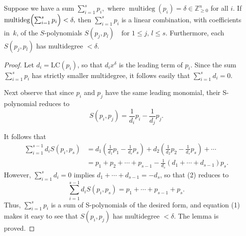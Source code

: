 \begin{lemma}\label{lem:Spolynomial_syzygy_of_degree_cancellation} %
    \leanok %
    Suppose we have a sum $\sum_{i=1}^s p_i,$ where $\operatorname{multideg}(p_i)=\delta\in\mathbb Z_{\ge0}^n$ for all $i$.
    If $\operatorname{multideg}\Bigl(\sum_{i=1}^s p_i\Bigr)<\delta,$ then $\sum_{i=1}^s p_i$ is a linear combination, with coefficients in~$k$, of the $S$-polynomials $S(p_j,p_l)\quad\text{for }1\le j,\,l\le s$.
    Furthermore, each $S(p_j,p_l)$ has multidegree $<\delta$.
\end{lemma}
\begin{proof}
  \leanok
  Let $d_i = \text{LC}(p_i)$, so that $d_i x^\delta$ is the leading term of $p_i$. Since the sum $\sum_{i=1}^s p_i$ has strictly smaller multidegree, it follows easily that $\sum_{i=1}^s d_i = 0$.

  Next observe that since $p_i$ and $p_j$ have the same leading monomial, their S-polynomial reduces to
  \begin{equation} \tag{1}
  S(p_i, p_j) = \frac{1}{d_i}p_i - \frac{1}{d_j}p_j.
  \end{equation}

  It follows that
  \begin{equation} \tag{2}
  \begin{aligned}
  \sum_{i=1}^{s-1} d_i S(p_i, p_s) &= d_1\left(\frac{1}{d_1}p_1 - \frac{1}{d_s}p_s\right) + d_2\left(\frac{1}{d_2}p_2 - \frac{1}{d_s}p_s\right) + \cdots \\
  &= p_1 + p_2 + \cdots + p_{s-1} - \frac{1}{d_s}(d_1 + \cdots + d_{s-1})p_s.
  \end{aligned}
  \end{equation}
  However, $\sum_{i=1}^s d_i = 0$ implies $d_1 + \cdots + d_{s-1} = -d_s$, so that (2) reduces to
  \[
  \sum_{i=1}^{s-1} d_i S(p_i, p_s) = p_1 + \cdots + p_{s-1} + p_s.
  \]
  Thus, $\sum_{i=1}^s p_i$ is a sum of S-polynomials of the desired form, and equation (1) makes it easy to see that $S(p_i, p_j)$ has multidegree $<\delta$. The lemma is proved.
\end{proof}


